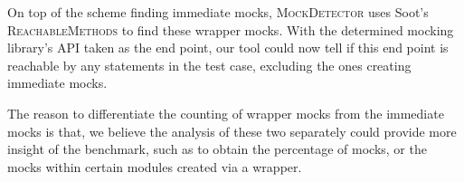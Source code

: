 
On top of the scheme finding immediate mocks, \textsc{MockDetector} uses Soot's \textsc{ReachableMethods} to find these wrapper mocks. With the determined mocking library's API taken as the end point, our tool could now tell if this end point is reachable by any statements in the test case, excluding the ones creating immediate mocks.



The reason to differentiate the counting of wrapper mocks from the immediate mocks is that, we believe the analysis of these two separately could provide more insight of the benchmark, such as to obtain the percentage of mocks, or the mocks within certain modules created via a wrapper.


